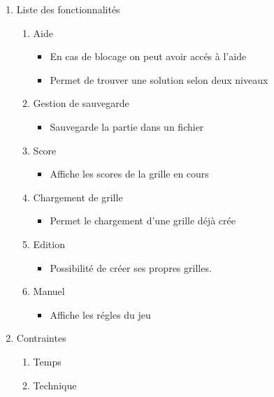 \documentclass[12pt]{beamer}
\begin{document}
   \begin{frame}
   \begin{enumerate}
   \item Liste des fonctionnalités
    
    \begin{enumerate}
                        
        \item Aide
        \begin{itemize}
            \item En cas de blocage on peut avoir accés à l'aide 
            \item Permet de trouver une solution selon deux niveaux
        \end{itemize}\pause
                        
        \item Gestion de sauvegarde
        \begin{itemize}
            \item Sauvegarde la partie dans un fichier
        \end{itemize}\pause
                        
        \item Score
        \begin{itemize}
            \item Affiche les scores de la grille en cours
        \end{itemize}\pause
                        
        \item Chargement de grille
        \begin{itemize}
            \item Permet le chargement d'une grille déjà crée
        \end{itemize}\pause
                        
        \item Edition
        \begin{itemize}
            \item Possibilité de créer ses propres grilles.
        \end{itemize}\pause
                        
        \item Manuel
        \begin{itemize}
            \item Affiche les régles du jeu
        \end{itemize}\pause
    \end{enumerate}
    
    
    \item Contraintes 
    \begin{enumerate}
        \item Temps
        \item Technique
    \end{enumerate}
    
    
    \end{enumerate}
\end{frame}
\end{document}
